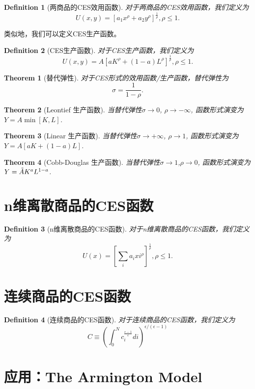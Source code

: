 \documentclass[UTF8]{ctexart}
\newtheorem{definition}{Definition}[section]
\newtheorem{theorem}{Theorem}[definition]
\theoremstyle{definition}
\begin{document}
\begin{definition}[两商品的CES效用函数]
对于两商品的CES效用函数，我们定义为
\[U(x,y)=\left[a_1 x^\rho+a_2 y^\rho\right]^\frac{1}{\rho},\rho\leq 1.\]
\end{definition}
类似地，我们可以定义CES生产函数。
\begin{definition}[CES生产函数]
对于CES生产函数，我们定义为
\[U(x,y)=A\left[a K^\rho+(1-a) L^\rho\right]^\frac{1}{\rho},\rho\leq 1.\]
\end{definition}
\begin{theorem}[替代弹性]
对于CES形式的效用函数/生产函数，替代弹性为
\[\sigma=\frac{1}{1-\rho}.\]
\end{theorem}
\begin{theorem}[Leontief 生产函数]
当替代弹性$\sigma\rightarrow0$, $\rho\rightarrow-\infty$, 函数形式演变为$Y = A\min[K, L]$.
\end{theorem}
\begin{theorem}[Linear 生产函数]
当替代弹性$\sigma\rightarrow +\infty$, $\rho\rightarrow1$, 函数形式演变为$Y = A[aK+(1-a)L]$.
\end{theorem}
\begin{theorem}[Cobb-Douglas 生产函数]
当替代弹性$\sigma\rightarrow 1$,$\rho\rightarrow 0$, 函数形式演变为$Y = \Tilde{A} K^a L^{1-a}$.
\end{theorem}

\section{n维离散商品的CES函数}
\begin{definition}[n维离散商品的CES函数]
对于n维离散商品的CES函数，我们定义为
\[U(x)=\left[\sum_i a_i xi^\rho\right]^\frac{1}{\rho},\rho\leq 1.\]
\end{definition}

\section{连续商品的CES函数}
\begin{definition}[连续商品的CES函数]
对于连续商品的CES函数，我们定义为
\[C \equiv\left(\int_{0}^{N} c_{i}^{\frac{\epsilon-1}{\epsilon}} d i\right)^{\epsilon /(\epsilon-1)}\]
\end{definition}



\section{应用：The Armington Model}
\end{document}
